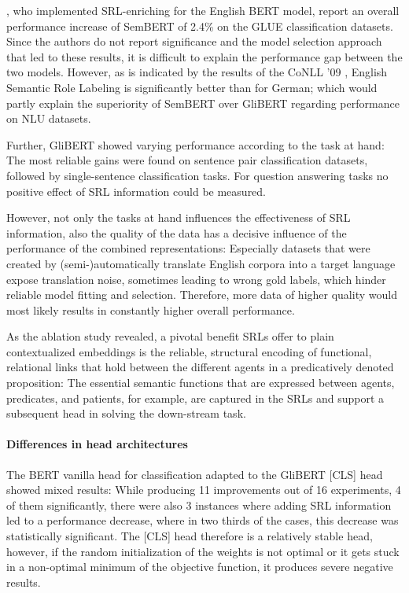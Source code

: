 {\cite{zhang2019semantics}, who implemented SRL-enriching for the English BERT model, report an
overall performance increase of SemBERT of 2.4\% on the GLUE classification datasets. Since the
authors do not report significance and the model selection approach that led to these results,
it is difficult to explain the performance gap between the two models. However, as is indicated
by the results of the CoNLL '09 \citep{hajivc2009conll} , English Semantic Role Labeling is
significantly better than for German; which would partly explain the superiority of SemBERT over
GliBERT regarding performance on NLU datasets.

Further, GliBERT showed varying performance according to the task at hand: The most reliable
gains were found on sentence pair classification datasets, followed
by single-sentence classification tasks. For question answering tasks no positive
effect of SRL information could be measured.

However, not only the tasks at hand influences the effectiveness of SRL information,
also the quality of the data has a decisive influence of the performance of the
combined representations: Especially datasets that were created by (semi-)automatically
translate English corpora into a target language expose translation noise, sometimes
leading to wrong gold labels, which hinder reliable model fitting and selection. Therefore,
more data of higher quality would most likely results in constantly higher overall performance.

As the ablation study revealed, a pivotal benefit SRLs offer to plain contextualized embeddings is
the reliable, structural encoding of functional, relational links that hold between the different
agents in a predicatively denoted proposition: The essential semantic functions that are expressed
between agents, predicates, and patients, for example, are captured in the SRLs and support a
subsequent head in solving the down-stream task.


\paragraph*{Differences in head architectures}

The BERT vanilla head for classification adapted to the GliBERT [CLS] head showed mixed results:
While producing 11 improvements out of 16 experiments, 4 of them significantly, there were also
3 instances where adding SRL information led to a performance decrease, where in two thirds of
the cases, this decrease was statistically significant. The [CLS] head therefore is a relatively
stable head, however, if the random initialization of the weights is not optimal or it gets stuck
in a non-optimal minimum of the objective function, it produces severe negative results.

}
